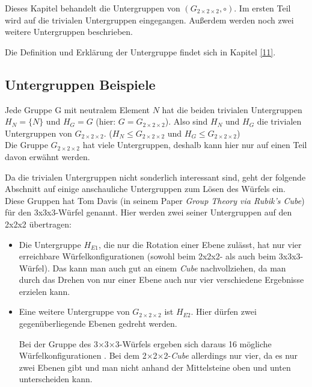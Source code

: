 \documentclass[12pt,a4paper, usenames, dvipsnames]{article}
\newcommand{\Gtwo}{\ensuremath{G_{2\times 2\times 2}}}
\newcommand{\Ttwo}{2$\times$2$\times$2-}
\newcommand{\Tthree}{3$\times$3$\times$3-}
\begin{document}
Dieses Kapitel behandelt die Untergruppen von $(\Gtwo, \circ)$. Im ersten Teil wird auf die trivialen Untergruppen eingegangen. Außerdem werden noch zwei weitere Untergruppen beschrieben.

Die Definition und Erklärung der Untergruppe findet sich in Kapitel \ref{11}.

%
%
%
%
%
%
%
%
%
%
%
%
%
%
%
%
%
%
%
%
\subsection*{Untergruppen Beispiele}



Jede Gruppe G mit neutralem Element $N$ hat die beiden trivialen Untergruppen ${H_N = \{N\}}$ und $H_G=G$ (hier: $G=\Gtwo$). Also sind $H_N$ und $H_G$ die trivialen Untergruppen von $\Gtwo$. ($H_N \leqslant \Gtwo$ und $H_G \leqslant \Gtwo$)\\
Die Gruppe $\Gtwo$ hat viele Untergruppen, deshalb kann hier nur auf einen Teil davon erwähnt werden. 


Da die trivialen Untergruppen nicht sonderlich interessant sind, geht der folgende Abschnitt auf einige anschauliche Untergruppen zum Lösen des Würfels ein. Diese Gruppen hat Tom Davis (in seinem Paper \textit{Group Theory via Rubik's Cube}) \cite{TD} für den 3x3x3-Würfel genannt. Hier werden zwei seiner Untergruppen auf den 2x2x2 übertragen: 
\begin{itemize}
\item Die Untergruppe $H_{E1}$, die nur die Rotation einer Ebene zulässt, hat nur vier erreichbare Würfelkonfigurationen (sowohl beim 2x2x2- als auch beim 3x3x3-Würfel). Das kann man auch gut an einem \textit{Cube} nachvollziehen, da man durch das Drehen von nur einer Ebene auch nur vier verschiedene Ergebnisse erzielen kann.
\item Eine weitere Untergruppe von $\Gtwo$ ist $H_{E2}$. Hier dürfen zwei gegenüberliegende Ebenen gedreht werden. 

Bei der Gruppe des \Tthree Würfels ergeben sich daraus 16 mögliche Würfelkonfigurationen \cite{TD}. Bei dem \Ttwo \textit{Cube} allerdings nur vier, da es nur zwei Ebenen gibt und man nicht anhand der Mittelsteine oben und unten unterscheiden kann.
\end{itemize}


%
%
%
%
%
%
%
%
%
%
%
%
%
%
%
%
%
%
%
%
\newpage
\end{document}
